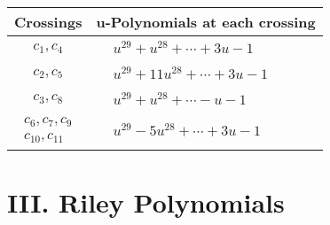 \documentclass[1p]{elsarticle_modified}
\theoremstyle{definition}
\begin{document}
\begin{tabular}{m{50pt}|m{274pt}}
Crossings & \hspace{64pt}u-Polynomials at each crossing \\
\hline $$\begin{aligned}c_{1},c_{4}\end{aligned}$$&$\begin{aligned}
&u^{29}+u^{28}+\cdots+3 u-1
\end{aligned}$\\
\hline $$\begin{aligned}c_{2},c_{5}\end{aligned}$$&$\begin{aligned}
&u^{29}+11 u^{28}+\cdots+3 u-1
\end{aligned}$\\
\hline $$\begin{aligned}c_{3},c_{8}\end{aligned}$$&$\begin{aligned}
&u^{29}+u^{28}+\cdots- u-1
\end{aligned}$\\
\hline $$\begin{aligned}c_{6},c_{7},c_{9}\\c_{10},c_{11}\end{aligned}$$&$\begin{aligned}
&u^{29}-5 u^{28}+\cdots+3 u-1
\end{aligned}$\\
\hline
\end{tabular}\newpage\renewcommand{\arraystretch}{1}
\centering \section*{ III. Riley Polynomials}
\end{document}
